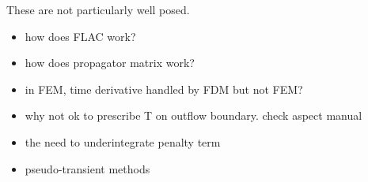 \documentclass[a4paper]{article}
\begin{document}
These are not particularly well posed. 

\begin{itemize}
\item how does FLAC work?
\item how does propagator matrix work?
\item in FEM, time derivative handled by FDM but not FEM?
\item why not ok to prescribe T on outflow boundary. check aspect manual
\item the need to underintegrate penalty term
\item pseudo-transient methods
\end{itemize}
\end{document}
